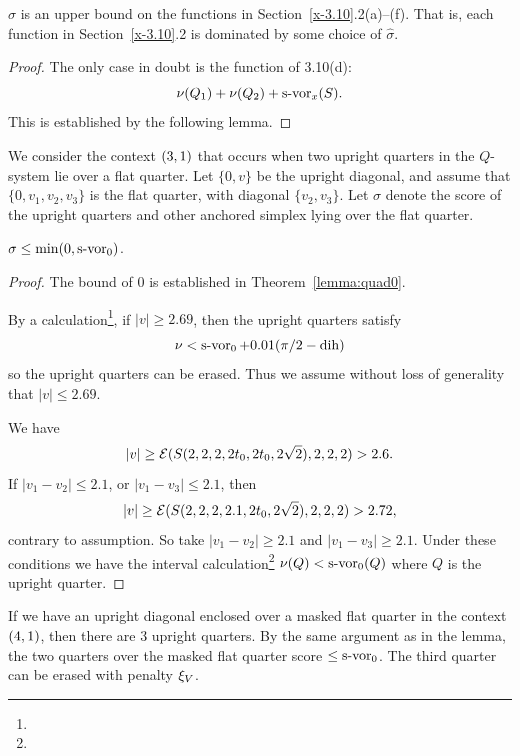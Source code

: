 \begin{lemma}
    \label{lemma:hatsigma}
$\hat\sigma$ is an upper bound on the functions in
Section~\ref{x-3.10}.2(a)--(f). That is, each function in
Section~\ref{x-3.10}.2 is dominated by some choice of $\hat\sigma$.
\end{lemma}

\begin{proof}  The only case in doubt is the function of 3.10(d):
$$\nu(Q_1)+\nu(Q_2)+\operatorname{s-vor}_x(S).$$ This is established by the
following lemma.
\end{proof}


We consider the context $\relax(3,1)$ that occurs when two upright
quarters in the $Q$-system lie over a flat quarter. Let $\{0,v\}$ be
the upright diagonal, and assume that $\{0,v_1,v_2,v_3\}$ is the
flat quarter, with diagonal $\{v_2,v_3\}$. Let $\sigma$ denote the
score of the upright quarters and other anchored simplex lying
over the flat quarter.

\begin{lemma}\label{lemma:min0-svor}
    $\sigma\le \min(0,\operatorname{s-vor}_0)$.
\end{lemma}

\begin{proof}
The bound of $0$ is established in Theorem~\ref{lemma:quad0}.

By a calculation\footnote{}, if $|v|\ge 2.69$,
then the upright quarters satisfy
    $$\nu < \operatorname{s-vor}_0 + 0.01 (\pi/2-\operatorname{dih})$$
so the upright quarters can be erased.  Thus we assume without
loss of generality that $|v|\le 2.69$.

We have
    $$|v|\ge{\mathcal E}(S(2,2,2,2t_0 ,2t_0 ,2\sqrt2),2,2,2)>2.6.$$
If $|v_1-v_2|\le 2.1$,  or $|v_1-v_3|\le 2.1$, then
    $$|v|\ge {\mathcal E}(S(2,2,2,2.1,2t_0 ,2\sqrt2),2,2,2)>2.72,$$
contrary to assumption.  So take $|v_1-v_2|\ge 2.1$ and
$|v_1-v_3|\ge2.1$. Under these conditions we have the interval
calculation\footnote{} %
  $\nu(Q) < \operatorname{s-vor}_0(Q)$ where $Q$ is the upright quarter.
\end{proof}

\begin{remark}
\label{remark:3rd-quarter} If we have an upright diagonal enclosed
over a masked flat quarter in the context $\relax(4,1)$, then there
are $3$ upright quarters.  By the same argument as in the lemma,
the two quarters over the masked flat quarter score $\le\operatorname{s-vor}_0$.
The third quarter can be erased with penalty $\xi_V$.
\end{remark}

